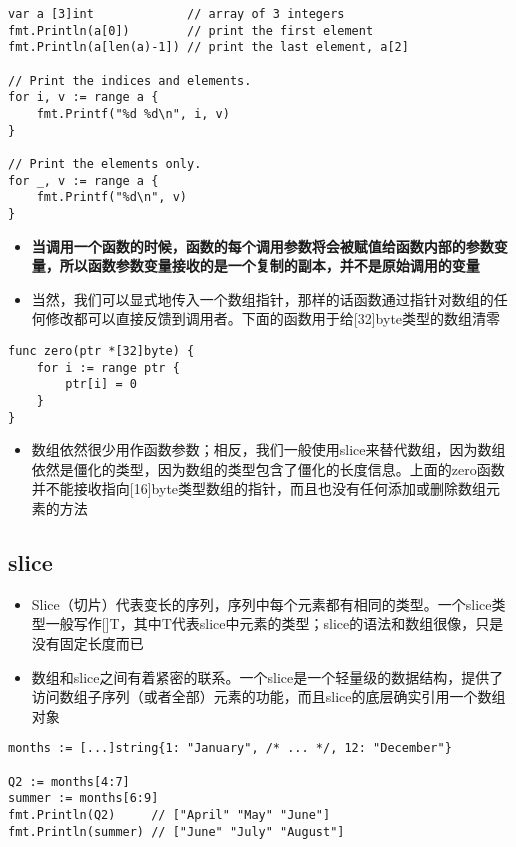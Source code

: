 \begin{verbatim}
var a [3]int             // array of 3 integers
fmt.Println(a[0])        // print the first element
fmt.Println(a[len(a)-1]) // print the last element, a[2]

// Print the indices and elements.
for i, v := range a {
    fmt.Printf("%d %d\n", i, v)
}

// Print the elements only.
for _, v := range a {
    fmt.Printf("%d\n", v)
}
\end{verbatim}

\begin{itemize}
\tightlist
\item
  \textbf{当调用一个函数的时候，函数的每个调用参数将会被赋值给函数内部的参数变量，所以函数参数变量接收的是一个复制的副本，并不是原始调用的变量}
\item
  当然，我们可以显式地传入一个数组指针，那样的话函数通过指针对数组的任何修改都可以直接反馈到调用者。下面的函数用于给{[}32{]}byte类型的数组清零
\end{itemize}

\begin{verbatim}
func zero(ptr *[32]byte) {
    for i := range ptr {
        ptr[i] = 0
    }
}
\end{verbatim}

\begin{itemize}
\tightlist
\item
  数组依然很少用作函数参数；相反，我们一般使用slice来替代数组，因为数组依然是僵化的类型，因为数组的类型包含了僵化的长度信息。上面的zero函数并不能接收指向{[}16{]}byte类型数组的指针，而且也没有任何添加或删除数组元素的方法
\end{itemize}

\hypertarget{slice}{%
\subsection{slice}\label{slice}}

\begin{itemize}
\tightlist
\item
  Slice（切片）代表变长的序列，序列中每个元素都有相同的类型。一个slice类型一般写作{[}{]}T，其中T代表slice中元素的类型；slice的语法和数组很像，只是没有固定长度而已
\item
  数组和slice之间有着紧密的联系。一个slice是一个轻量级的数据结构，提供了访问数组子序列（或者全部）元素的功能，而且slice的底层确实引用一个数组对象
\end{itemize}

\begin{verbatim}
months := [...]string{1: "January", /* ... */, 12: "December"}

Q2 := months[4:7]
summer := months[6:9]
fmt.Println(Q2)     // ["April" "May" "June"]
fmt.Println(summer) // ["June" "July" "August"]
\end{verbatim}

